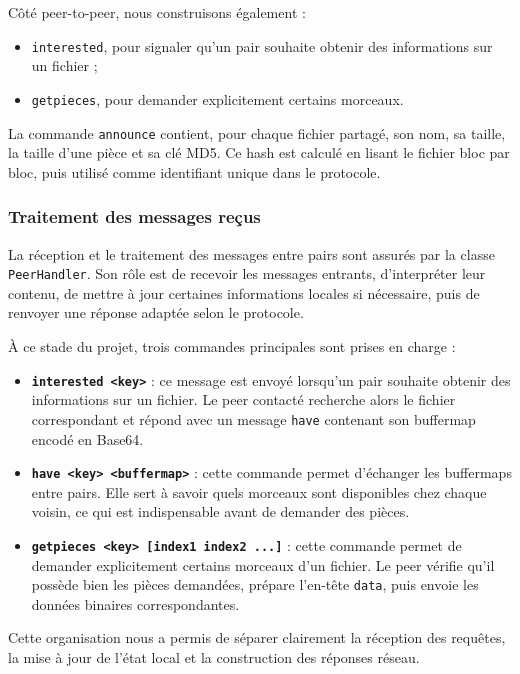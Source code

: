 Côté peer-to-peer, nous construisons également :
\begin{itemize}
    \item \texttt{interested}, pour signaler qu’un pair souhaite obtenir des informations sur un fichier ;
    \item \texttt{getpieces}, pour demander explicitement certains morceaux.
\end{itemize}
La commande \texttt{announce} contient, pour chaque fichier partagé, son nom, sa taille, la taille d’une pièce et sa clé MD5. Ce hash est calculé en lisant le fichier bloc par bloc, puis utilisé comme identifiant unique dans le protocole.


\subsubsection{Traitement des messages reçus}

La réception et le traitement des messages entre pairs sont assurés par la classe \texttt{PeerHandler}. 
Son rôle est de recevoir les messages entrants, d’interpréter leur contenu, 
de mettre à jour certaines informations locales si nécessaire, puis de renvoyer 
une réponse adaptée selon le protocole.

À ce stade du projet, trois commandes principales sont prises en charge :

\begin{itemize}
    \item \textbf{\texttt{interested <key>}} : ce message est envoyé lorsqu’un pair souhaite obtenir des informations sur un fichier. Le peer contacté recherche alors le fichier correspondant et répond avec un message \texttt{have} contenant son buffermap encodé en Base64.

    \item \textbf{\texttt{have <key> <buffermap>}} : cette commande permet d’échanger les buffermaps entre pairs. Elle sert à savoir quels morceaux sont disponibles chez chaque voisin, ce qui est indispensable avant de demander des pièces.

    \item \textbf{\texttt{getpieces <key> [index1 index2 ...]}} : cette commande permet de demander explicitement certains morceaux d’un fichier. Le peer vérifie qu’il possède bien les pièces demandées, prépare l’en-tête \texttt{data}, puis envoie les données binaires correspondantes.
\end{itemize}

Cette organisation nous a permis de séparer clairement la réception des requêtes, 
la mise à jour de l’état local et la construction des réponses réseau.

